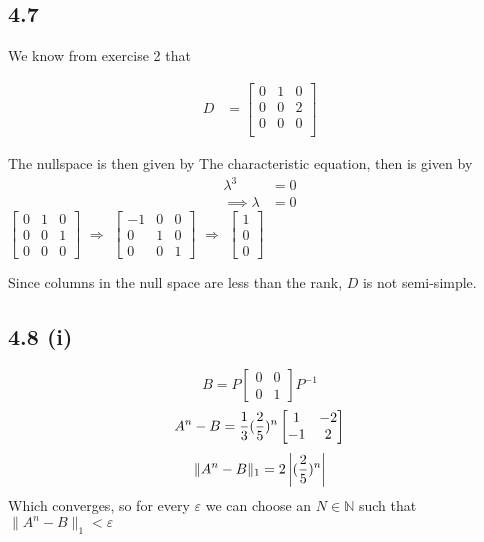\documentclass[letterpaper,12pt]{article}
\theoremstyle{definition}
\begin{document}
\subsection*{4.7}

We know from exercise 2 that

\begin{align*}
    D &= 
\begin{bmatrix}
    0 & 1 & 0\\
    0 & 0 & 2\\
    0 & 0 & 0\\
\end{bmatrix}
\end{align*}

The nullspace is then given by 
The characteristic equation, then is given by 
\begin{align*}
\lambda^3 &= 0\\
\implies \lambda &= 0
\end{align*}
$\begin{bmatrix} 
    0 & 1 & 0\\
    0 & 0 & 1\\
    0 & 0 & 0
\end{bmatrix}$  
$\Rightarrow$ 
$\begin{bmatrix} 
    -1 & 0 & 0\\
    0 & 1 & 0\\
    0 & 0 & 1 
\end{bmatrix}$
$\Rightarrow$
$\begin{bmatrix}
1\\
0\\
0
\end{bmatrix}$\\

\bigskip

Since columns in the null space are less than the rank, $D$ is not semi-simple.

\subsection*{4.8 (i)}
\[B = P
\begin{bmatrix}
    0 & 0\\
    0 & 1
    
\end{bmatrix}
P^{-1}\]
\[A^n - B = {1\over3}({2\over5})^n
\begin{bmatrix}
    1 & -2 \\
    -1 & 2
    
\end{bmatrix}\]
\[\|{ A^n - B}\|_1 = 2 \left| ({2 \over 5})^n \right| \]
Which converges, so for every $\varepsilon$ we can choose an $N \in \mathbb{N}$ such that $\| A^n - B\|_1 < \varepsilon$
\end{document}
